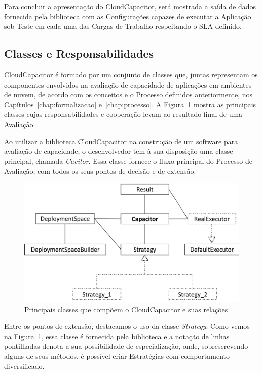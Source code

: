 Para concluir a apresentação do CloudCapacitor, será mostrada a saída de dados
fornecida pela biblioteca com as Configurações capazes de executar a
Aplicação sob Teste em cada uma das Cargas de Trabalho respeitando o SLA definido.

\subsection{Classes e Responsabilidades}
\label{subsec:classes}
CloudCapacitor é formado por um conjunto de classes que, juntas representam os
componentes envolvidos na avaliação de capacidade de aplicações em ambientes de
nuvem, de acordo com os conceitos e o Processo definidos anteriormente, nos
Capítulos~\ref{chap:formalizacao} e~\ref{chap:processo}. A Figura~\ref{fig:classes}
mostra as principais classes cujas responsabilidades e cooperação levam ao 
resultado final de uma Avaliação. 

Ao utilizar a biblioteca CloudCapacitor na construção de um software para avaliação
de capacidade, o desenvolvedor tem à sua disposição uma classe principal, chamada
\emph{Cacitor}. Essa classe fornece o fluxo principal do Processo de Avaliação, com todos
os seus pontos de decisão e de extensão.

\begin{figure}[htb]
  \caption{\label{fig:classes}Principais classes que compõem o CloudCapacitor e suas relações}
  \begin{center}
    \includegraphics[scale=0.75]{img/CapacitorClasses}
  \end{center}
\end{figure}

Entre os pontos de extensão, destacamos o uso da classe \emph{Strategy}. Como 
vemos na Figura~\ref{fig:classes}, essa classe é fornecida pela biblioteca e a
notação de linhas pontilhadas denota a sua possibilidade de especialização, onde,
sobrescrevendo alguns de seus métodos, é possível criar Estratégias com comportamento
diversificado.

